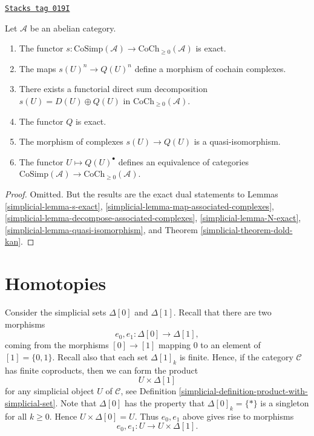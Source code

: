 \begin{lemma}
\label{simplicial-lemma-dual-dold-kan}
\href{https://stacks.math.columbia.edu/tag/019I}{\texttt{Stacks tag 019I}}

Let $\mathcal{A}$ be an abelian category.
\begin{enumerate}
\item The functor
$s : \text{CoSimp}(\mathcal{A}) \to \text{CoCh}_{\geq 0}(\mathcal{A})$
is exact.
\item The maps $s(U)^n \to Q(U)^n$ define a morphism
of cochain complexes.
\item There exists a functorial direct sum decomposition
$s(U) = D(U) \oplus Q(U)$ in $\text{CoCh}_{\geq 0}(\mathcal{A})$.
\item The functor $Q$ is exact.
\item The morphism of complexes $s(U) \to Q(U)$ is a quasi-isomorphism.
\item The functor $U \mapsto Q(U)^\bullet$ defines
an equivalence of categories
$\text{CoSimp}(\mathcal{A}) \to \text{CoCh}_{\geq 0}(\mathcal{A})$.
\end{enumerate}
\end{lemma}

\begin{proof}

Omitted. But the results are the exact dual statements to
Lemmas \ref{simplicial-lemma-s-exact}, \ref{simplicial-lemma-map-associated-complexes},
\ref{simplicial-lemma-decompose-associated-complexes},
\ref{simplicial-lemma-N-exact}, \ref{simplicial-lemma-quasi-isomorphism}, and
Theorem \ref{simplicial-theorem-dold-kan}.
\end{proof}

\section{Homotopies}
\label{simplicial-section-homotopy}
Consider the simplicial sets $\Delta[0]$ and $\Delta[1]$.
Recall that there are two morphisms
$$
e_0, e_1 : \Delta[0] \longrightarrow \Delta[1],
$$
coming from the morphisms $[0] \to [1]$ mapping
$0$ to an element of $[1] = \{0, 1\}$. Recall also that each
set $\Delta[1]_k$ is finite. Hence, if the category
$\mathcal{C}$ has finite coproducts, then we can
form the product
$$
U \times \Delta[1]
$$
for any simplicial object $U$ of $\mathcal{C}$, see
Definition \ref{simplicial-definition-product-with-simplicial-set}.
Note that $\Delta[0]$ has the property that $\Delta[0]_k = \{*\}$
is a singleton for all $k \geq 0$. Hence $U \times \Delta[0]
= U$. Thus $e_0, e_1$ above gives rise to morphisms
$$
e_0, e_1 : U \to U \times \Delta[1].
$$

